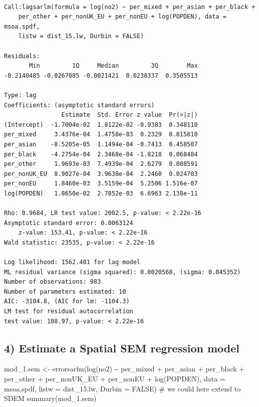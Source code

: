 \documentclass[
  letterpaper,
]{scrbook}
\newenvironment{Shaded}{\begin{snugshade}}{\end{snugshade}}
\newcommand{\AttributeTok}[1]{\textcolor[rgb]{0.40,0.45,0.13}{#1}}
\newcommand{\CommentTok}[1]{\textcolor[rgb]{0.37,0.37,0.37}{#1}}
\newcommand{\ConstantTok}[1]{\textcolor[rgb]{0.56,0.35,0.01}{#1}}
\newcommand{\FunctionTok}[1]{\textcolor[rgb]{0.28,0.35,0.67}{#1}}
\newcommand{\NormalTok}[1]{\textcolor[rgb]{0.00,0.23,0.31}{#1}}
\newcommand{\OtherTok}[1]{\textcolor[rgb]{0.00,0.23,0.31}{#1}}
\newcommand{\SpecialCharTok}[1]{\textcolor[rgb]{0.37,0.37,0.37}{#1}}
\begin{document}
\begin{verbatim}

Call:lagsarlm(formula = log(no2) ~ per_mixed + per_asian + per_black + 
    per_other + per_nonUK_EU + per_nonEU + log(POPDEN), data = msoa.spdf, 
    listw = dist_15.lw, Durbin = FALSE)

Residuals:
       Min         1Q     Median         3Q        Max 
-0.2140485 -0.0267085 -0.0021421  0.0238337  0.3505513 

Type: lag 
Coefficients: (asymptotic standard errors) 
                Estimate  Std. Error z value  Pr(>|z|)
(Intercept)  -1.7004e-02  1.8122e-02 -0.9383  0.348110
per_mixed     3.4376e-04  1.4758e-03  0.2329  0.815810
per_asian    -8.5205e-05  1.1494e-04 -0.7413  0.458507
per_black    -4.2754e-04  2.3468e-04 -1.8218  0.068484
per_other     1.9693e-03  7.4939e-04  2.6279  0.008591
per_nonUK_EU  8.9027e-04  3.9638e-04  2.2460  0.024703
per_nonEU     1.8460e-03  3.5159e-04  5.2506 1.516e-07
log(POPDEN)   1.8650e-02  2.7852e-03  6.6963 2.138e-11

Rho: 0.9684, LR test value: 2002.5, p-value: < 2.22e-16
Asymptotic standard error: 0.0063124
    z-value: 153.41, p-value: < 2.22e-16
Wald statistic: 23535, p-value: < 2.22e-16

Log likelihood: 1562.401 for lag model
ML residual variance (sigma squared): 0.0020568, (sigma: 0.045352)
Number of observations: 983 
Number of parameters estimated: 10 
AIC: -3104.8, (AIC for lm: -1104.3)
LM test for residual autocorrelation
test value: 108.97, p-value: < 2.22e-16
\end{verbatim}

\hypertarget{estimate-a-spatial-sem-regression-model}{%
\subsection*{4) Estimate a Spatial SEM regression
model}\label{estimate-a-spatial-sem-regression-model}}

\begin{Shaded}
\begin{Highlighting}[]
\NormalTok{mod\_1.sem }\OtherTok{\textless{}{-}} \FunctionTok{errorsarlm}\NormalTok{(}\FunctionTok{log}\NormalTok{(no2) }\SpecialCharTok{\textasciitilde{}}\NormalTok{ per\_mixed }\SpecialCharTok{+}\NormalTok{ per\_asian }\SpecialCharTok{+}\NormalTok{ per\_black }\SpecialCharTok{+}\NormalTok{ per\_other}
                      \SpecialCharTok{+}\NormalTok{ per\_nonUK\_EU }\SpecialCharTok{+}\NormalTok{ per\_nonEU  }\SpecialCharTok{+} \FunctionTok{log}\NormalTok{(POPDEN),  }
                      \AttributeTok{data =}\NormalTok{ msoa.spdf, }
                      \AttributeTok{listw =}\NormalTok{ dist\_15.lw,}
                      \AttributeTok{Durbin =} \ConstantTok{FALSE}\NormalTok{) }\CommentTok{\# we could here extend to SDEM}
\FunctionTok{summary}\NormalTok{(mod\_1.sem)}
\end{Highlighting}
\end{Shaded}
\end{document}
